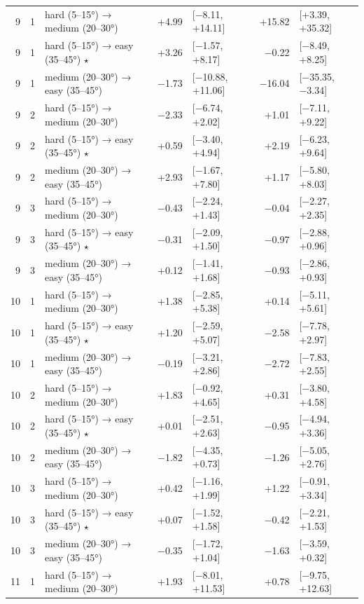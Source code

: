 \begin{table}[htbp]
\begin{tabular}{rllrlrl}
    9 & 1 & hard (5–15°) → medium (20–30°) & +4.99 & [−8.11, +14.11] & +15.82 & [+3.39, +35.32] \\
    9 & 1 & hard (5–15°) → easy (35–45°) $\star$ & +3.26 & [−1.57, +8.17] & −0.22 & [−8.49, +8.25] \\
    9 & 1 & medium (20–30°) → easy (35–45°) & −1.73 & [−10.88, +11.06] & −16.04 & [−35.35, −3.34] \\
    9 & 2 & hard (5–15°) → medium (20–30°) & −2.33 & [−6.74, +2.02] & +1.01 & [−7.11, +9.22] \\
    9 & 2 & hard (5–15°) → easy (35–45°) $\star$ & +0.59 & [−3.40, +4.94] & +2.19 & [−6.23, +9.64] \\
    9 & 2 & medium (20–30°) → easy (35–45°) & +2.93 & [−1.67, +7.80] & +1.17 & [−5.80, +8.03] \\
    9 & 3 & hard (5–15°) → medium (20–30°) & −0.43 & [−2.24, +1.43] & −0.04 & [−2.27, +2.35] \\
    9 & 3 & hard (5–15°) → easy (35–45°) $\star$ & −0.31 & [−2.09, +1.50] & −0.97 & [−2.88, +0.96] \\
    9 & 3 & medium (20–30°) → easy (35–45°) & +0.12 & [−1.41, +1.68] & −0.93 & [−2.86, +0.93] \\
    10 & 1 & hard (5–15°) → medium (20–30°) & +1.38 & [−2.85, +5.38] & +0.14 & [−5.11, +5.61] \\
    10 & 1 & hard (5–15°) → easy (35–45°) $\star$ & +1.20 & [−2.59, +5.07] & −2.58 & [−7.78, +2.97] \\
    10 & 1 & medium (20–30°) → easy (35–45°) & −0.19 & [−3.21, +2.86] & −2.72 & [−7.83, +2.55] \\
    10 & 2 & hard (5–15°) → medium (20–30°) & +1.83 & [−0.92, +4.65] & +0.31 & [−3.80, +4.58] \\
    10 & 2 & hard (5–15°) → easy (35–45°) $\star$ & +0.01 & [−2.51, +2.63] & −0.95 & [−4.94, +3.36] \\
    10 & 2 & medium (20–30°) → easy (35–45°) & −1.82 & [−4.35, +0.73] & −1.26 & [−5.05, +2.76] \\
    10 & 3 & hard (5–15°) → medium (20–30°) & +0.42 & [−1.16, +1.99] & +1.22 & [−0.91, +3.34] \\
    10 & 3 & hard (5–15°) → easy (35–45°) $\star$ & +0.07 & [−1.52, +1.58] & −0.42 & [−2.21, +1.53] \\
    10 & 3 & medium (20–30°) → easy (35–45°) & −0.35 & [−1.72, +1.04] & −1.63 & [−3.59, +0.32] \\
    11 & 1 & hard (5–15°) → medium (20–30°) & +1.93 & [−8.01, +11.53] & +0.78 & [−9.75, +12.63] \\

\end{tabular}
\end{table}

